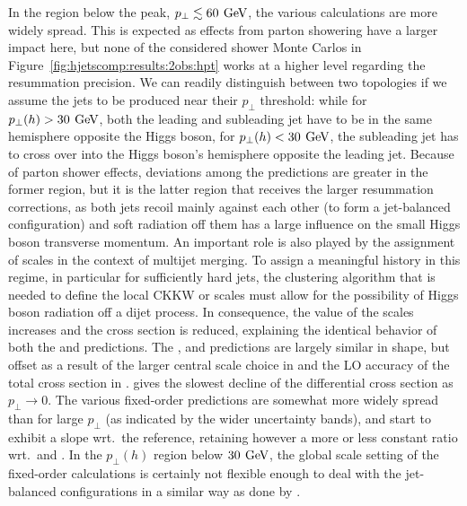 In the region below the peak, $p_\perp\lesssim 60\,\text{\:GeV}$, the various
calculations are more widely spread. This is expected as effects from
parton showering have a larger impact here, but none of the considered
shower Monte Carlos in Figure~\ref{fig:hjetscomp:results:2obs:hpt}
works at a higher level regarding the resummation precision. We can
readily distinguish between two topologies if we assume the jets to be
produced near their $p_\perp$ threshold: while for
$p_\perp(h)>30\,\text{\:GeV}$, both the leading and subleading jet have to be in
the same hemisphere opposite the Higgs boson, for
$p_\perp(h)<30\,\text{\:GeV}$, the subleading jet has to cross over into the
Higgs boson's hemisphere opposite the leading jet.
Because of  parton shower effects, deviations among the predictions
are greater in the former region, but it is the latter region that
receives the larger resummation corrections, as both jets recoil mainly
against each other (to form a jet-balanced configuration) and soft
radiation off them has a large influence on the small Higgs boson
transverse momentum. An important role is also played by the
assignment of scales in the context of multijet merging.
To assign a meaningful history in this regime, in particular
for sufficiently hard jets, the clustering algorithm that is needed to
define the local CKKW or \hjetscompMinlo scales must allow for the possibility
of Higgs boson radiation off a dijet process. In consequence, the value
of the scales increases and the cross section is reduced, explaining
the identical behavior of both the \hjetscompSherpa \hjetscompMEPSatNLO and \hjetscompSherpa
\hjetscompNNLOPS predictions.
The \hjetscompHerwig, \hjetscompMGaMC and \hjetscompHej predictions are largely similar in shape,
but offset as a result of the larger central scale choice in \hjetscompMGaMC
and the LO accuracy of the total cross section in \hjetscompHej. \hjetscompPowheg
\hjetscompNNLOPS gives the slowest decline of the differential cross section as
$p_\perp\to0$.
The various fixed-order predictions are somewhat more widely spread than
for large $p_\perp$ (as indicated by the wider uncertainty bands), and
start to exhibit a slope wrt.~the \hjetscompPowheg reference, retaining however
a more or less constant ratio wrt.~\hjetscompHerwig and \hjetscompMGaMC. In the
$p_\perp(h)$ region below $30\,\text{\:GeV}$, the global scale setting of the
fixed-order calculations is certainly not flexible enough to deal with
the jet-balanced configurations in a similar way as done by \hjetscompSherpa.

